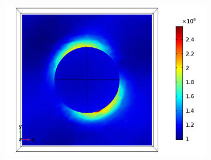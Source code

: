 \begin{figure}[htb!]
\begin{subfigure}{0.32\textwidth}
        \centering
        \includegraphics[width=\linewidth]{figures/ch4/S5A/FieldDistribution/phi25/z2/Sample5A_TE_Slice@z=+05Rz_wl=500_phi=25.png}
   \end{subfigure}
   \vspace{0.7cm}
   

\end{figure}

